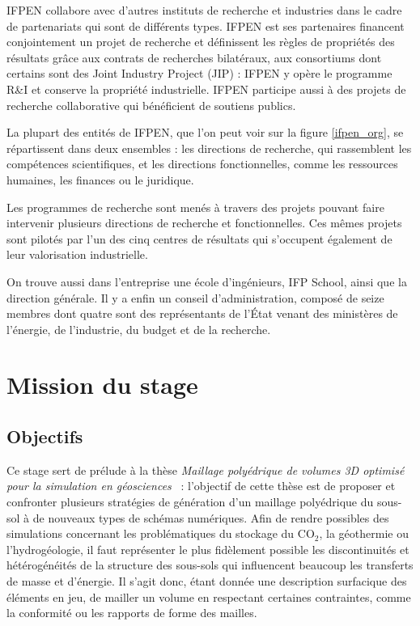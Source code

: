 \documentclass[12pt,a4paper]{report}
\begin{document}
IFPEN collabore avec d'autres instituts de recherche et industries dans le cadre de partenariats qui sont de différents types. IFPEN est ses partenaires financent conjointement un projet de recherche et définissent les règles de propriétés des résultats grâce aux contrats de recherches bilatéraux, aux consortiums dont certains sont des Joint Industry Project (JIP) : IFPEN y opère le programme R\&I et conserve la propriété industrielle. IFPEN participe aussi à des projets de recherche collaborative qui bénéficient de soutiens publics.

La plupart des entités de IFPEN, que l'on peut voir sur la figure \ref{ifpen_org}, se répartissent dans deux ensembles : les directions de recherche, qui rassemblent les compétences scientifiques, et les directions fonctionnelles, comme les ressources humaines, les finances ou le juridique.

Les programmes de recherche sont menés à travers des projets pouvant faire intervenir plusieurs directions de recherche et fonctionnelles. Ces mêmes projets sont pilotés par l'un des cinq centres de résultats qui s'occupent également de leur valorisation industrielle.

On trouve aussi dans l'entreprise une école d'ingénieurs, IFP School, ainsi que la direction générale. Il y a enfin un conseil d'administration, composé de seize membres dont quatre sont des représentants de l'\'Etat venant des ministères de l'énergie, de l'industrie, du budget et de la recherche.

\newpage
\section{Mission du stage}

\subsection{Objectifs}

Ce stage sert de prélude à la thèse \og \emph{Maillage polyédrique de volumes 3D optimisé pour la simulation en géosciences} \fg{}~: l'objectif de cette thèse est de proposer et confronter plusieurs stratégies de génération d'un maillage polyédrique du sous-sol à de nouveaux types de schémas numériques. Afin de rendre possibles des simulations concernant les problématiques du stockage du CO$_2$, la géothermie ou l'hydrogéologie, il faut représenter le plus fidèlement possible les discontinuités et hétérogénéités de la structure des sous-sols qui influencent beaucoup les transferts de masse et d'énergie. Il s'agit donc, étant donnée une description surfacique des éléments en jeu, de mailler un volume en respectant certaines contraintes, comme la conformité ou les rapports de forme des mailles.
\end{document}
